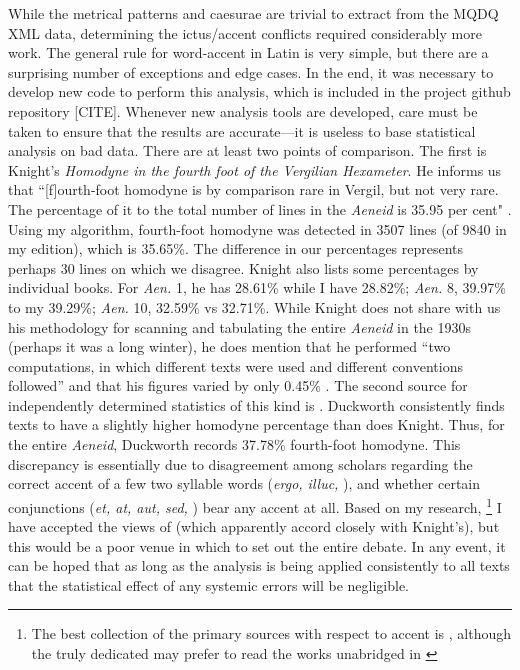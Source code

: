 \documentclass[11pt,a4paper]{scrartcl} %
\begin{document}
While the metrical patterns and caesurae are trivial to extract from the MQDQ XML data, determining the ictus/accent conflicts required considerably more work. The general rule for word-accent in Latin is very simple, but there are a surprising number of exceptions and edge cases. In the end, it was necessary to develop new code to perform this analysis, which is included in the project github repository [CITE]. Whenever new analysis tools are developed, care must be taken to ensure that the results are accurate---it is useless to base statistical analysis on bad data. There are at least two points of comparison. The first is Knight's \textit{Homodyne in the fourth foot of the Vergilian Hexameter}. He informs us that ``[f]ourth-foot homodyne is by comparison rare in Vergil, but not very rare. The percentage of it to the total number of lines in the \textit{Aeneid} is 35.95 per cent" \cite[186]{knight_homodyne_1931}. Using my algorithm, fourth-foot homodyne was detected in 3507 lines (of 9840 in my edition), which is 35.65\%. The difference in our percentages represents perhaps 30 lines on which we disagree. Knight also lists some percentages by individual books. For \textit{Aen.} 1, he has 28.61\% while I have 28.82\%; \textit{Aen.} 8, 39.97\% to my 39.29\%; \textit{Aen.} 10, 32.59\% vs 32.71\%. While Knight does not share with us his methodology for scanning and tabulating the entire \textit{Aeneid} in the 1930s (perhaps it was a long winter), he does mention that he performed ``two computations, in which different texts were used and different conventions followed'' and that his figures varied by only 0.45\% \cite[186 n. 1]{knight_homodyne_1931}. The second source for independently determined statistics of this kind is \citet[19-20, plus final Table]{duckworth_vergil_1969}. Duckworth consistently finds texts to have a slightly higher homodyne percentage than does Knight. Thus, for the entire \textit{Aeneid}, Duckworth records 37.78\% fourth-foot homodyne. This discrepancy is essentially due to disagreement among scholars regarding the correct accent of a few two syllable words (\textit{ergo, illuc,} \textellipsis), and whether certain conjunctions (\textit{et, at, aut, sed,} \textellipsis) bear any accent at all. Based on my research,%
\footnote{The best collection of the primary sources with respect to accent is \cite{schoell_accentu_1876}, although the truly dedicated may prefer to read the works unabridged in \cite{keil_heinrich_grammatici_1857}}
I have accepted the views of \citet[88-9]{allen_vox_1965} (which apparently accord closely with Knight's), but this would be a poor venue in which to set out the entire debate. In any event, it can be hoped that as long as the analysis is being applied consistently to all texts that the statistical effect of any systemic errors will be negligible.
\end{document}
